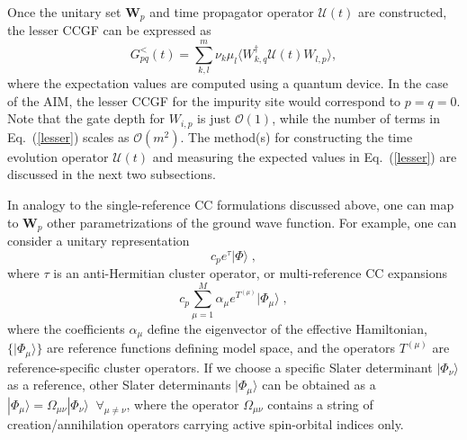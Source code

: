 \documentclass[aip,reprint,table,xcdraw,usenames,dvipsnames]{revtex4-1}
\begin{document}
Once the unitary set $\mathbf{W}_p$ and time propagator operator $\mathcal{U}(t)$ are constructed, the lesser CCGF can be expressed as
%
\begin{equation} 
G^{<}_{pq}(t) = \sum_{k,l}^m \nu_k \mu_l
\langle W^\dagger_{k,q} \mathcal{U}(t) W^{\phantom\dagger}_{l,p} \rangle, \label{lesser}
\end{equation}
%
where the expectation values are computed using a quantum device. In the case of the AIM, the lesser CCGF for the impurity site would correspond to $p = q = 0$. 
Note that the gate depth for $W_{i,p}$ is just $\mathcal{O}(1)$, while the number of terms in Eq.~(\ref{lesser}) scales as $\mathcal{O}(m^2)$. 
 The method(s) for constructing the time evolution operator $\mathcal{U}(t)$ and measuring the expected values in Eq.~(\ref{lesser}) are discussed in the next two subsections.

 
In analogy to the single-reference CC formulations discussed above, one can map to $\mathbf{W}_p$ other parametrizations of the ground wave function. 
For example, one can consider a unitary representation 
\begin{equation}
c_p e^{\tau}|\Phi\rangle \;, \label{ucc}
\end{equation}
where $\tau$ is an anti-Hermitian cluster operator, or multi-reference CC expansions 
\begin{equation}
c_p \sum_{\mu=1}^M \alpha_{\mu} e^{T^{(\mu)}} |\Phi_{\mu}\rangle \;,
\label{mrcc}
\end{equation}
where the coefficients $\alpha_{\mu}$ define the eigenvector of the effective Hamiltonian, 
$\lbrace |\Phi_{\mu}\rangle \rbrace$ are reference functions defining model space, and the operators $T^{(\mu)}$ are reference-specific cluster operators. If we choose a specific Slater determinant $|\Phi_{\nu}\rangle$ as a reference, other Slater determinants 
$|\Phi_{\mu}\rangle$ can be obtained as a $|\Phi_{\mu}\rangle=\Omega_{\mu\nu} |\Phi_{\nu}\rangle \;\; \forall_{\mu \ne \nu}$, where the operator $\Omega_{\mu\nu}$ contains a string of creation/annihilation operators carrying active spin-orbital indices only.


\setlength\tabcolsep{0pt}
\renewcommand{\arraystretch}{2.1}

\newcommand{\specialcell}[2][c]{%
\begin{tabular}[#1]{@{}c@{}}#2\end{tabular}}
\end{document}
